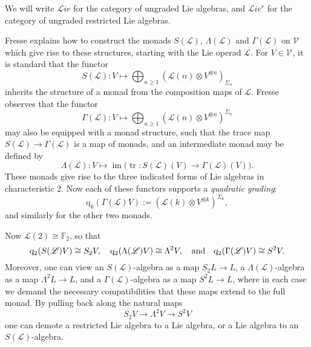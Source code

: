 \documentclass[11pt]{amsart} \renewcommand{\baselinestretch}{1.2}
\theoremstyle{plain}
\theoremstyle{definition}
\DeclareMathOperator{\im}{im}
\DeclareMathOperator{\trace}{tr}
\renewcommand{\to}{\longrightarrow}
\newcommand{\scrL}{\mathscr{L}}
\newcommand{\calV}{\mathcal{V}}
\newcommand{\LieOperad}{{\scrL}}
\newcommand{\vect}[2]{\calV^{#1}_{#2}}
\newcommand{\quadgrad}[1]{\mathrm{q}_{#1}}
\newcommand{\F}{\mathbb{F}}
\newcommand{\liealgs}{{\scrL\!\textit{ie}}}
\newcommand{\restliealgs}{{\scrL\!\textit{ie}^\textit{r}}}
\newcommand{\Ftwo}{\F_2}
\renewcommand{\mapsto}{\longmapsto}
\begin{document}
\begin{Conventions and notation}
We will  write $\liealgs$ for the category of ungraded Lie algebras, and $\restliealgs$ for the category of ungraded restricted Lie algebras.

Fresse \cite{FresseSimplicialAlgs.pdf} explains how to construct the monads $S(\LieOperad)$, $\Lambda(\LieOperad)$ and $\Gamma(\LieOperad)$ on $\vect{}{}$ which give rise to these structures, starting with the Lie operad $\LieOperad$. For $V\in\vect{}{}$, it is standard that the functor
\[S(\LieOperad):V\mapsto \bigoplus_{n\geq1}(\LieOperad(n)\otimes V^{\otimes n})_{\Sigma_n}\]
inherits the structure of a monad from the composition maps of $\LieOperad$. Fresse observes that the functor
\[\Gamma(\LieOperad):V\mapsto \bigoplus_{n\geq1}(\LieOperad(n)\otimes V^{\otimes n})^{\Sigma_n}\]
may also be equipped with a monad structure, such that the trace map $S(\LieOperad)\to \Gamma(\LieOperad)$
is a map of monads, and an intermediate monad may be defined by
\[\Lambda(\LieOperad):V\mapsto\im\bigl(\trace:S(\LieOperad)(V)\to \Gamma(\LieOperad)(V)\bigr).\]
These monads give rise to the three indicated forms of Lie algebras in characteristic 2. Now each of these functors supports a \emph{quadratic grading}:
\[\quadgrad{k}(\Gamma(\LieOperad)V):=(\LieOperad(k)\otimes V^{\otimes k})^{\Sigma_k},\]
and similarly for the other two monads.

 Now $\LieOperad(2)\cong\Ftwo $, so that
\[\quadgrad{2}(S(\LieOperad)V)\cong S_2V,\quad \quadgrad{2}(\Lambda(\LieOperad)V)\cong \Lambda^2V,\quad\textup{and}\quad\quadgrad{2}(\Gamma(\LieOperad)V)\cong S^2V.\]
Moreover, one can view an $S(\LieOperad)$-algebra as a map $S_2L\to L$, a $\Lambda(\LieOperad)$-algebra as a map $\Lambda^2L\to L$, and a $\Gamma(\LieOperad)$-algebra as a map $S^2L\to L$, where in each case we demand the necessary compatibilities that these maps extend to the full monad. %
By pulling back along the natural maps
\[S_2V\to \Lambda^2 V\to S^2V\]
one can demote a restricted Lie algebra to a Lie algebra, or a Lie algebra to an $S(\LieOperad)$-algebra.


\end{Conventions and notation}
\end{document}
